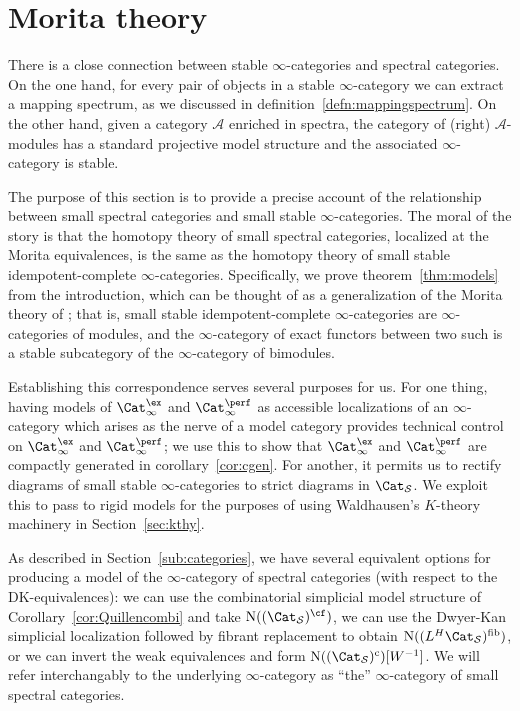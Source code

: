 \documentclass{amsart}
\let\catsymbfont\mathcal
\newcommand{\aA}{{\catsymbfont{A}}}
\newcommand{\N}{\mathrm{N}}
\newcommand{\stabcat}{\Cat_\i^{\ex}}
\newcommand{\idemstabcat}{\Cat_\i^{\perf}}
\newcommand{\Spcat}{\Cat_\mathcal{S}}%
\renewcommand{\i}{\infty}
\numberwithin{equation}{section}
\theoremstyle{definition}
\begin{document}
\section{Morita theory}\label{sec:specinf}

There is a close connection between stable $\i$-categories and
spectral categories.  On the one hand, for every pair of objects in a
stable $\i$-category we can extract a mapping spectrum, as we
discussed in definition~\ref{defn:mappingspectrum}.  On the other
hand, given a category $\aA$ enriched in spectra, the category of
(right) $\aA$-modules has a standard projective model structure and
the associated $\i$-category is stable.

The purpose of this section is to provide a precise account of the
relationship between small spectral categories and small stable
$\i$-categories.  The moral of the story is that the homotopy theory
of small spectral categories, localized at the Morita equivalences, is
the same as the homotopy theory of small stable idempotent-complete
$\i$-categories.  Specifically, we prove theorem~\ref{thm:models} from
the introduction, which can be thought of as a generalization of the Morita theory of \cite{SS}; that is, small stable idempotent-complete $\i$-categories are $\i$-categories of
modules, and the $\i$-category of exact functors between two such is a
stable subcategory of the $\i$-category of bimodules.

Establishing this correspondence serves several purposes for us.  For
one thing, having models of $\stabcat$ and $\idemstabcat$ as
accessible localizations of an $\i$-category which arises as the nerve
of a model category provides technical control on $\stabcat$ and
$\idemstabcat$; we use this to show that $\stabcat$ and $\idemstabcat$
are compactly generated in corollary~\ref{cor:cgen}.  For another, it
permits us to rectify diagrams of small stable $\i$-categories to
strict diagrams in $\Spcat$.  We exploit this to pass to rigid models
for the purposes of using Waldhausen's $K$-theory machinery in
Section~\ref{sec:kthy}.

As described in Section~\ref{sub:categories}, we have several
equivalent options for producing a model of the $\i$-category of
spectral categories (with respect to the DK-equivalences): we can use
the combinatorial simplicial model structure of
Corollary~\ref{cor:Quillencombi} and take $\N((\Spcat)^{\cf})$, we can
use the Dwyer-Kan simplicial localization followed by fibrant
replacement to obtain $\N((L^H \Spcat)^\mathrm{fib})$, or we can invert the weak
equivalences and form $\N((\Spcat)^{\mathrm{c}})[W^{-1}]$.  We will
refer interchangably to the underlying $\i$-category as ``the''
$\i$-category of small spectral categories.
\end{document}
